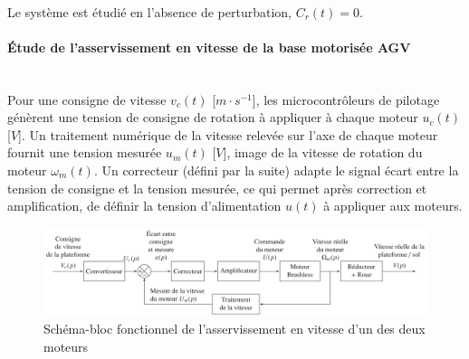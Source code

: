 
~\ \\

Le système est étudié en l'absence de perturbation, $C_r(t)=0$.


\paragraph{Étude de l'asservissement en vitesse de la base motorisée AGV} ~\ \\
 
Pour une consigne de vitesse $v_c(t)$ [$m\cdot s^{-1}$], les microcontrôleurs de pilotage génèrent une tension de consigne de rotation à appliquer à chaque moteur $u_c(t)$ [$V$]. Un traitement numérique de la vitesse relevée sur l'axe de chaque moteur fournit une tension mesurée $u_m(t)$ [$V$], image de la vitesse de rotation du moteur $\omega_m(t)$. Un correcteur (défini par la suite) adapte le signal écart entre la tension de consigne et la tension mesurée, ce qui permet après correction et amplification, de définir la tension d'alimentation $u(t)$ à appliquer aux moteurs.

\begin{figure}[ht!]
\begin{center}
 \includegraphics[width=\linewidth]{img/fig08}
\end{center}
\caption{Schéma-bloc fonctionnel de l'asservissement en vitesse d'un des deux moteurs}
\label{fig08}
\end{figure}

